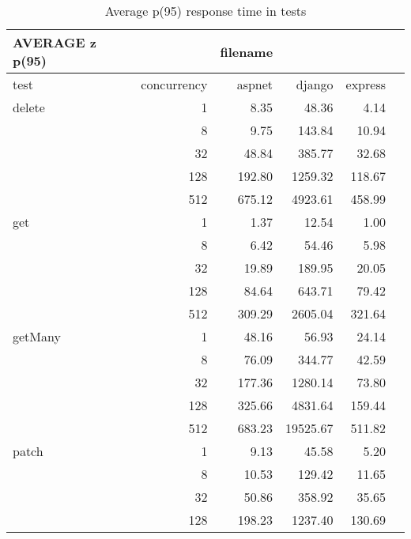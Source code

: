 \begin{table}[!htp]\centering
    \caption{Average p(95) response time in tests}\label{tab:resultsFromFile}
    \scriptsize
    \begin{tabular}{lrrrrr}\toprule
        AVERAGE z p(95) &             & filename &          &         \\\midrule
        test            & concurrency & aspnet   & django   & express \\
        delete          & 1           & 8.35     & 48.36    & 4.14    \\
                        & 8           & 9.75     & 143.84   & 10.94   \\
                        & 32          & 48.84    & 385.77   & 32.68   \\
                        & 128         & 192.80   & 1259.32  & 118.67  \\
                        & 512         & 675.12   & 4923.61  & 458.99  \\
        get             & 1           & 1.37     & 12.54    & 1.00    \\
                        & 8           & 6.42     & 54.46    & 5.98    \\
                        & 32          & 19.89    & 189.95   & 20.05   \\
                        & 128         & 84.64    & 643.71   & 79.42   \\
                        & 512         & 309.29   & 2605.04  & 321.64  \\
        getMany         & 1           & 48.16    & 56.93    & 24.14   \\
                        & 8           & 76.09    & 344.77   & 42.59   \\
                        & 32          & 177.36   & 1280.14  & 73.80   \\
                        & 128         & 325.66   & 4831.64  & 159.44  \\
                        & 512         & 683.23   & 19525.67 & 511.82  \\
        patch           & 1           & 9.13     & 45.58    & 5.20    \\
                        & 8           & 10.53    & 129.42   & 11.65   \\
                        & 32          & 50.86    & 358.92   & 35.65   \\
                        & 128         & 198.23   & 1237.40  & 130.69  \\

\end{tabular}
\end{table}
